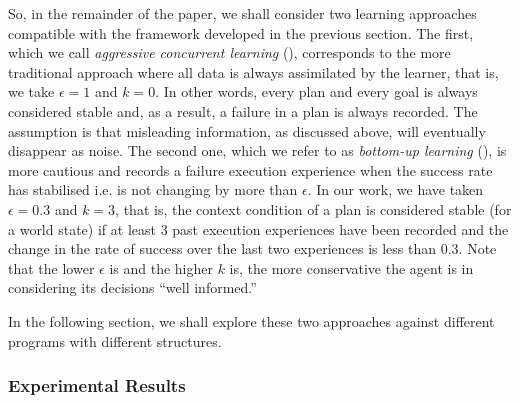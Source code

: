 So, in the remainder of the paper, we shall consider two learning approaches
compatible with the framework developed in the previous section. The first, which
we call \emph{aggressive concurrent learning} (\CL), corresponds to the more
traditional approach where all data is always assimilated by the learner, that
is, we take $\epsilon = 1$ and $k = 0$. In other words, every plan and every goal
is always considered stable and, as a result, a failure in a plan is always
recorded. The assumption is that misleading information, as discussed above, will
eventually disappear as noise.
The second one, which we refer to as \emph{bottom-up learning} (\BUL), is more
cautious and records a failure execution experience when the success rate has stabilised i.e. is not changing by more than $\epsilon$.
In our work, we have taken
$\epsilon = 0.3$ and $k = 3$, that is, the context condition of a plan is
considered stable (for a world state) if at least $3$ past execution experiences
have been recorded 
and the change in the rate of success over the last two experiences is less than $0.3$.
Note that the lower $\epsilon$ is and the higher $k$ is, the more conservative
the agent is in considering its decisions ``well informed.''

In the following section, we shall explore these two approaches against
different programs with different structures.



\subsubsection{Experimental Results}\label{sec:experiments}

